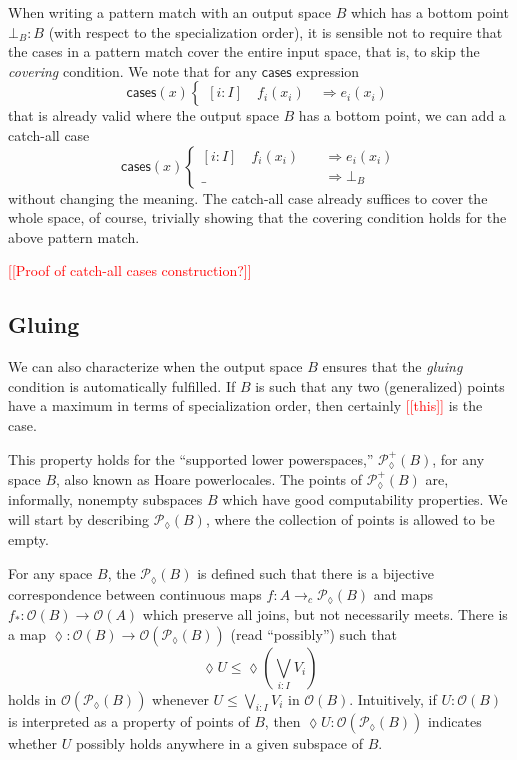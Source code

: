 \documentclass[conference]{IEEEtran}
\newcommand{\PLower}{\mathcal{P}_\lozenge}
\newcommand{\cto}{\to_c}
\newcommand{\Open}[1]{\mathcal{O}({#1})}
\newcommand{\wildcard}{\_}
\newcommand{\Branch}{\Rightarrow}
\newcommand{\note}[1]{\textcolor{red}{[[{#1}]]}}
\begin{document}
When writing a pattern match with an output space $B$ which has a bottom point $\bot_B : B$ (with respect to the specialization order), it is sensible not to require that the cases in a pattern match cover the entire input space, that is, to skip the \emph{covering} condition. We note that for any $\mathsf{cases}$ expression
\[
\mathsf{cases}(x)
\begin{cases}
[i : I] \quad f_i(x_i) \quad \Branch e_i(x_i)
\end{cases}
\]
that is already valid where the output space $B$ has a bottom point, we can add a catch-all case
\[
\mathsf{cases}(x)
\begin{cases}
[i : I] \quad f_i(x_i) \quad &\Branch e_i(x_i)
\\ \wildcard \quad &\Branch \bot_B
\end{cases}
\]
without changing the meaning. The catch-all case already suffices to cover the whole space, of course, trivially showing that the covering condition holds for the above pattern match.

\note{Proof of catch-all cases construction?}

\subsection{Gluing}

We can also characterize when the output space $B$ ensures that the \emph{gluing} condition is automatically fulfilled. If $B$ is such that any two (generalized) points have a maximum in terms of specialization order, then certainly \note{this} is the case.

This property holds for the ``supported lower powerspaces,'' $\PLower^+(B)$, for any space $B$, also known as Hoare powerlocales. The points of $\PLower^+(B)$ are, informally, nonempty subspaces $B$ which have good computability properties. We will start by describing $\PLower(B)$, where the collection of points is allowed to be empty.

For any space $B$, the $\PLower(B)$ is defined such that there is a bijective correspondence between continuous maps $f : A \cto \PLower(B)$ and maps $f_* : \Open{B} \to \Open{A}$ which preserve all joins, but not necessarily meets. There is a map $\lozenge : \Open{B} \to \Open{\PLower(B)}$ (read ``possibly'') such that
\[
\lozenge U \le \lozenge \left( \bigvee_{i : I} V_i \right)
\]
holds in $\Open{\PLower(B)}$ whenever $U \le \bigvee_{i : I} V_i$ in $\Open{B}$. Intuitively, if $U : \Open{B}$ is interpreted as a property of points of $B$, then $\lozenge U : \Open{\PLower(B)}$ indicates whether $U$ possibly holds anywhere in a given subspace of $B$.
\end{document}
